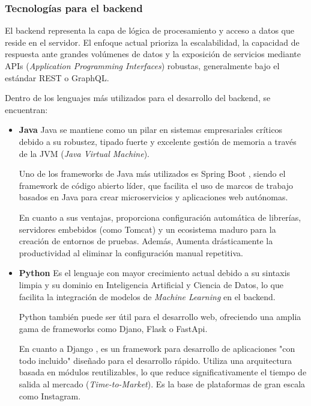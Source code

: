 \subsubsection{Tecnologías para el backend}

El backend representa la capa de lógica de procesamiento y acceso a datos que reside en el servidor. El enfoque actual 
prioriza la escalabilidad, la capacidad de respuesta ante grandes volúmenes de datos y la exposición de servicios 
mediante APIs (\textit{Application Programming Interfaces}) robustas, generalmente bajo el estándar REST o GraphQL.

Dentro de los lenguajes más utilizados para el desarrollo del backend, se encuentran: 

\begin{itemize}
    \item \textbf{Java} 
    \newline
    Java se mantiene como un pilar en sistemas empresariales críticos debido a su robustez, tipado fuerte y excelente 
    gestión de memoria a través de la JVM (\textit{Java Virtual Machine}).

    Uno de los frameworks de Java más utilizados es Spring Boot \cite{springBoot}, siendo el framework de código abierto 
    líder, que facilita el uso de marcos de trabajo basados en Java para crear microservicios y aplicaciones web autónomas.

    En cuanto a sus ventajas, proporciona configuración automática de librerías, servidores embebidos (como Tomcat) y un 
    ecosistema maduro para la creación de entornos de pruebas. Además, Aumenta drásticamente la productividad al eliminar 
    la configuración manual repetitiva.

    \item \textbf{Python}
    \newline
    Es el lenguaje con mayor crecimiento actual debido a su sintaxis limpia y su dominio en Inteligencia Artificial y Ciencia 
    de Datos, lo que facilita la integración de modelos de \textit{Machine Learning} en el backend.

    Python también puede ser útil para el desarrollo web, ofreciendo una amplia gama de frameworks como Djano, Flask o
    FastApi.

    En cuanto a Django \cite{django}, es un framework para desarrollo de aplicaciones "con todo incluido" diseñado para el 
    desarrollo rápido. Utiliza una arquitectura basada en módulos reutilizables, lo que reduce significativamente el tiempo 
    de salida al mercado (\textit{Time-to-Market}). Es la base de plataformas de gran escala como Instagram.


\end{itemize}
